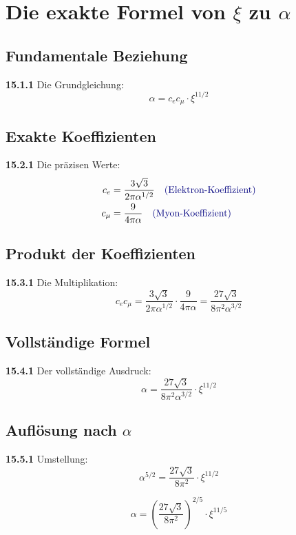 \documentclass[12pt,a4paper]{article}
\begin{document}
\section{Die exakte Formel von $\xi$ zu $\alpha$}

\subsection{Fundamentale Beziehung}

\noindent \textbf{15.1.1} Die Grundgleichung:
\[
\boxed{\alpha = c_e c_\mu \cdot \xi^{11/2}}
\]

\subsection{Exakte Koeffizienten}

\noindent \textbf{15.2.1} Die präzisen Werte:
\begin{align*}
	c_e &= \frac{3\sqrt{3}}{2\pi\alpha^{1/2}} \quad \textcolor{deepblue}{\text{(Elektron-Koeffizient)}} \\
	c_\mu &= \frac{9}{4\pi\alpha} \quad \textcolor{deepblue}{\text{(Myon-Koeffizient)}}
\end{align*}

\subsection{Produkt der Koeffizienten}

\noindent \textbf{15.3.1} Die Multiplikation:
\[
c_e c_\mu = \frac{3\sqrt{3}}{2\pi\alpha^{1/2}} \cdot \frac{9}{4\pi\alpha} = \frac{27\sqrt{3}}{8\pi^2\alpha^{3/2}}
\]

\subsection{Vollständige Formel}

\noindent \textbf{15.4.1} Der vollständige Ausdruck:
\[
\alpha = \frac{27\sqrt{3}}{8\pi^2\alpha^{3/2}} \cdot \xi^{11/2}
\]

\subsection{Auflösung nach $\alpha$}

\noindent \textbf{15.5.1} Umstellung:
\[
\alpha^{5/2} = \frac{27\sqrt{3}}{8\pi^2} \cdot \xi^{11/2}
\]

\[
\alpha = \left(\frac{27\sqrt{3}}{8\pi^2}\right)^{2/5} \cdot \xi^{11/5}
\]
\end{document}
